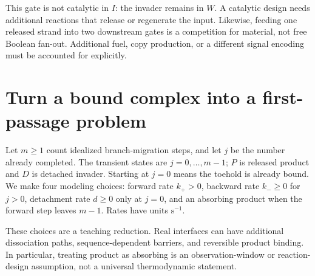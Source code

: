 
This gate is not catalytic in $I$: the invader remains in $W$. A catalytic
design needs additional reactions that release or regenerate the input.
Likewise, feeding one released strand into two downstream gates is a competition
for material, not free Boolean fan-out. Additional fuel, copy production, or
a different signal encoding must be accounted for explicitly.


\section{Turn a bound complex into a first-passage problem}
Let $m\geq1$ count idealized branch-migration steps, and let $j$ be the number
already completed. The transient states are $j=0,\ldots,m-1$; $P$ is released
product and $D$ is detached invader. Starting at $j=0$ means the toehold is
already bound. We make four modeling choices: forward rate $k_+>0$, backward
rate $k_-\geq0$ for $j>0$, detachment rate $d\geq0$ only at $j=0$, and an
absorbing product when the forward step leaves $m-1$. Rates have units
$\mathrm{s}^{-1}$.

These choices are a teaching reduction. Real interfaces can have additional
dissociation paths, sequence-dependent barriers, and reversible product binding.
In particular, treating product as absorbing is an observation-window or
reaction-design assumption, not a universal thermodynamic statement.

